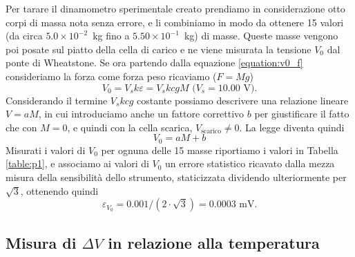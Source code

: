 \documentclass[italian, a4paper, 10pt, twocolumn]{../../style/lab_unige}
\newcommand{\reftab}[1]{Tabella {\ref{#1}}}%
\newcommand{\mstdErr}[1]{\varepsilon_{#1}}
\begin{document}
    Per tarare il dinamometro sperimentale creato prendiamo in considerazione otto corpi di massa nota senza errore, e li combiniamo in modo da ottenere 15 valori (da circa $5.0\times10^{-2}$~kg fino a $5.50\times10^{-1}$~kg) di masse. Queste masse vengono poi posate sul piatto della cella di carico e ne viene misurata la tensione $V_0$ dal ponte di Wheatstone. 
    Se ora partendo dalla equazione \ref{equation:v0_f} consideriamo la forza come forza peso ricaviamo ($F=Mg$)
    \begin{equation}
        V_0=V_sk\varepsilon=V_skcgM\text{ ($V_s=10.00$~V).}\label{eqation:v0_mg}
    \end{equation}
    Considerando il termine $V_skcg$ costante possiamo descrivere una relazione lineare $V=aM$, in cui introduciamo anche un fattore correttivo $b$ per giustificare il fatto che con $M=0$, e quindi con la cella scarica, $V_{\text{scarico}}\neq0$. La legge diventa quindi
    \begin{equation}
        V_0=aM+b
    \end{equation}
    Misurati i valori di $V_0$ per ognuna delle 15 masse riportiamo i valori in \reftab{table:p1}, e associamo ai valori di $V_0$ un errore statistico ricavato dalla mezza misura della sensibilità dello strumento, staticizzata dividendo ulteriormente per $\sqrt{3}$, ottenendo quindi \[\mstdErr{V_0} = 0.001/(2\cdot\sqrt{3})=0.0003\text{ mV.}\]

    

    \subsection{Misura di $\Delta V$ in relazione alla temperatura}
\end{document}
